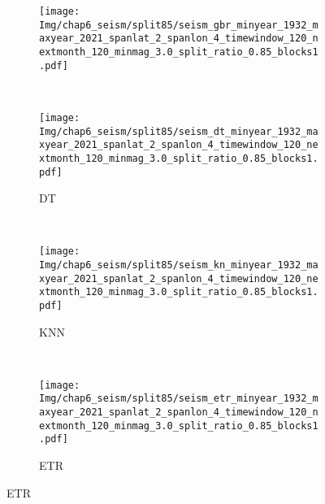 \begin{figure}[!htbp]
\begin{subfigure}[b]{0.45\textwidth}
    \vspace{-0.2cm}
    \texttt{[image: Img/chap6\_seism/split85/seism\_gbr\_minyear\_1932\_maxyear\_2021\_spanlat\_2\_spanlon\_4\_timewindow\_120\_nextmonth\_120\_minmag\_3.0\_split\_ratio\_0.85\_blocks1.pdf]}
    \vspace{-1cm}
    \label{fig:seism_gbr_minyear_1932_maxyear_2021_spanlat_2_spanlon_4_timewindow_120_nextmonth_120_minmag_3.0_split_ratio_0.85_blocks1}
  \end{subfigure}
  ~
  \begin{subfigure}[b]{0.45\textwidth}
    \caption{DT}
    \vspace{-0.2cm}
    \texttt{[image: Img/chap6\_seism/split85/seism\_dt\_minyear\_1932\_maxyear\_2021\_spanlat\_2\_spanlon\_4\_timewindow\_120\_nextmonth\_120\_minmag\_3.0\_split\_ratio\_0.85\_blocks1.pdf]}
    \vspace{-1cm}
    \label{fig:seism_dt_minyear_1932_maxyear_2021_spanlat_2_spanlon_4_timewindow_120_nextmonth_120_minmag_3.0_split_ratio_0.85_blocks1}
  \end{subfigure}
  \\
  \begin{subfigure}[b]{0.45\textwidth}
    \caption{KNN}
    \vspace{-0.2cm}
    \texttt{[image: Img/chap6\_seism/split85/seism\_kn\_minyear\_1932\_maxyear\_2021\_spanlat\_2\_spanlon\_4\_timewindow\_120\_nextmonth\_120\_minmag\_3.0\_split\_ratio\_0.85\_blocks1.pdf]}
    \vspace{-1cm}
    \label{fig:seism_knn_minyear_1932_maxyear_2021_spanlat_2_spanlon_4_timewindow_120_nextmonth_120_minmag_3.0_split_ratio_0.85_blocks1}
  \end{subfigure}
  ~
  \begin{subfigure}[b]{0.45\textwidth}
    \caption{ETR}
    \vspace{-0.2cm}
    \texttt{[image: Img/chap6\_seism/split85/seism\_etr\_minyear\_1932\_maxyear\_2021\_spanlat\_2\_spanlon\_4\_timewindow\_120\_nextmonth\_120\_minmag\_3.0\_split\_ratio\_0.85\_blocks1.pdf]}
    \vspace{-1cm}
    \label{fig:seism_etr_minyear_1932_maxyear_2021_spanlat_2_spanlon_4_timewindow_120_nextmonth_120_minmag_3.0_split_ratio_0.85_blocks1}
  \end{subfigure}
  \label{fig:seism_minyear_1932_maxyear_2021_spanlat_2_spanlon_4_timewindow_120_nextmonth_120_minmag_3.0_split_ratio_0.85_blocks1}
\end{figure}

